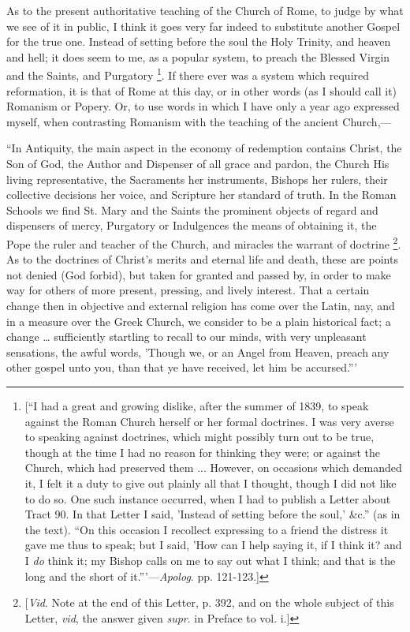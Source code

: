 As to the present authoritative teaching of the
Church of Rome, to judge by what we see of it in public, I think it goes very far indeed to substitute another Gospel for the true one.
Instead of setting before the soul the Holy Trinity, and heaven and
hell; it does seem to me, as a popular system, to preach the Blessed
Virgin and the Saints, and Purgatory \footnote{[``I had a great and growing dislike, after the
summer of 1839, to speak against the Roman Church herself or her
formal doctrines. I was very averse to speaking against doctrines,
which might possibly turn out to be true, though at the time I had no
reason for thinking they were; or against the Church, which had
preserved them ... However, on occasions which demanded it, I felt it
a duty to give out plainly all that I thought, though I did not like
to do so. One such instance occurred, when I had to publish a Letter
about Tract 90. In that Letter I said, 'Instead of setting before the
soul,' \&c.'' (as in the text). ``On this occasion I recollect
expressing to a friend the distress it gave me thus to speak; but I
said, 'How can I help saying it, if I think it? and I \emph{do} think
it; my Bishop calls on me to say out what I think; and that is the
long and the short of it.'''—\emph{Apolog}. pp. 121-123.]}. If there ever was a system which required reformation, it is
that of Rome at this day, or in other words (as I should call it)
Romanism or Popery. Or, to use words in which I have only a year ago
expressed myself, when contrasting Romanism with the teaching of the
ancient Church,—

``In Antiquity, the
main aspect in the economy of redemption contains Christ, the Son of
God, the Author and Dispenser of all grace and pardon, the Church His
living representative, the Sacraments her instruments, Bishops her
rulers, their collective decisions her voice, and Scripture her
standard of truth. In the Roman Schools we find St. Mary and the
Saints the prominent objects of regard and dispensers of mercy,
Purgatory or Indulgences the means of obtaining it, the Pope the ruler
and teacher of the Church, and miracles the warrant of doctrine
\footnote{[\emph{Vid}. Note at the end of this Letter, p. 392, and on the whole
subject of this Letter, \emph{vid}, the answer given \emph{supr}. in
Preface to vol. i.]}. As
to the doctrines of Christ's merits and eternal life and death, these
are points not denied (God forbid), but taken for granted and passed
by, in order to make way for others of more present, pressing, and
lively interest. That a certain change then in objective and external
religion has come over the Latin, nay, and in a measure over the Greek
Church, we consider to be a plain historical fact; a change
… sufficiently startling to
recall to our minds, with very unpleasant sensations, the awful words,
'Though we, or an Angel from Heaven, preach any other gospel unto you,
than that ye have received, let him be accursed.'''

